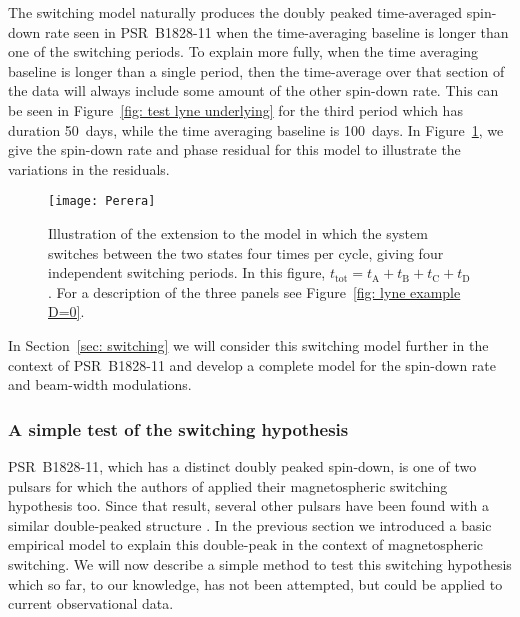 The \citet{Perera2015} switching model naturally produces the doubly peaked
time-averaged spin-down rate seen in PSR~B1828-11 when the time-averaging baseline is longer
than one of the switching periods. To explain more fully, when the time
averaging baseline is longer than a single period, then the time-average over
that section of the data will always include some amount of the other spin-down
rate. This can be seen in Figure~\ref{fig: test lyne underlying} for the third
period which has duration 50~days, while the time averaging baseline is
100~days. In Figure~\ref{fig: perera example}, we give the spin-down rate and
phase residual for this model to illustrate the variations in the residuals.
\begin{figure}[htb]
    \centering
    \texttt{[image: Perera]}
    \caption{Illustration of the \citet{Perera2015} extension to the
    \citet{Lyne2010} model in which the system switches between the two states
    four times per cycle, giving four independent switching periods. In this
    figure, $t_\textrm{tot}=t_\textrm{A}+t_\textrm{B}+t_\textrm{C}+t_\textrm{D}$.
    For a description
    of the three panels see Figure~\ref{fig: lyne example D=0}.}
    \label{fig: perera example}
\end{figure}

In Section~\ref{sec: switching} we will consider this switching
model further in the context of PSR~B1828-11 and develop a complete model for the
spin-down rate and beam-width modulations.

\subsubsection{A simple test of the switching hypothesis}
\label{sec: switching predictions}
PSR~B1828-11, which has a distinct doubly peaked spin-down, is one of two
pulsars for which the authors of \citet{Lyne2010} applied their magnetospheric
switching hypothesis too. Since
that result, several other pulsars have been found with a similar double-peaked
structure \citep{Perera2015, Perera2016}. In the previous section we introduced
a basic empirical model to explain this double-peak in the context of
magnetospheric switching. We will now describe a simple method to test this
switching hypothesis which so far, to our knowledge, has not been attempted,
but could be applied to current observational data.

